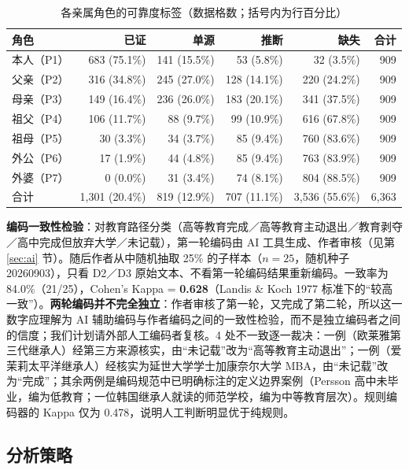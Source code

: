 \documentclass[UTF8,a4paper,11pt]{ctexart}
\begin{document}
\begin{table}[htbp]
\centering
\caption{各亲属角色的可靠度标签（数据格数；括号内为行百分比）}
\label{tab:reliability}
\small
\begin{tabular}{lrrrrr}
\toprule
角色 & 已证 & 单源 & 推断 & 缺失 & 合计 \\
\midrule
本人（P1） & 683 (75.1\%) & 141 (15.5\%) &  53 (5.8\%) &  32 (3.5\%) & 909 \\
父亲（P2） & 316 (34.8\%) & 245 (27.0\%) & 128 (14.1\%) & 220 (24.2\%) & 909 \\
母亲（P3） & 149 (16.4\%) & 236 (26.0\%) & 183 (20.1\%) & 341 (37.5\%) & 909 \\
祖父（P4） & 106 (11.7\%) &  88 (9.7\%)  &  99 (10.9\%) & 616 (67.8\%) & 909 \\
祖母（P5） &  30 (3.3\%)  &  34 (3.7\%)  &  85 (9.4\%)  & 760 (83.6\%) & 909 \\
外公（P6） &  17 (1.9\%)  &  44 (4.8\%)  &  85 (9.4\%)  & 763 (83.9\%) & 909 \\
外婆（P7） &   0 (0.0\%)  &  31 (3.4\%)  &  74 (8.1\%)  & 804 (88.5\%) & 909 \\
\midrule
合计 & 1{,}301 (20.4\%) & 819 (12.9\%) & 707 (11.1\%) & 3{,}536 (55.6\%) & 6{,}363 \\
\bottomrule
\end{tabular}
\end{table}

\textbf{编码一致性检验}：对教育路径分类（高等教育完成／高等教育主动退出／教育剥夺／高中完成但放弃大学／未记载），第一轮编码由 AI 工具生成、作者审核（见第 \ref{sec:ai} 节）。随后作者从中随机抽取 25\% 的子样本（$n=25$，随机种子 20260903），只看 D2／D3 原始文本、不看第一轮编码结果重新编码。一致率为 84.0\%（21/25），Cohen's Kappa = \textbf{0.628}（Landis \& Koch 1977 标准下的“较高一致”）。\textbf{两轮编码并不完全独立}：作者审核了第一轮，又完成了第二轮，所以这一数字应理解为 AI 辅助编码与作者编码之间的一致性检验，而不是独立编码者之间的信度；我们计划请外部人工编码者复核。4 处不一致逐一裁决：一例（欧莱雅第三代继承人）经第三方来源核实，由“未记载”改为“高等教育主动退出”；一例（爱茉莉太平洋继承人）经核实为延世大学学士加康奈尔大学 MBA，由“未记载”改为“完成”；其余两例是编码规范中已明确标注的定义边界案例（Persson 高中未毕业，编为低教育；一位韩国继承人就读的师范学校，编为中等教育层次）。规则编码器的 Kappa 仅为 0.478，说明人工判断明显优于纯规则。

\subsection{分析策略}
\label{sec:strategy}
\end{document}
